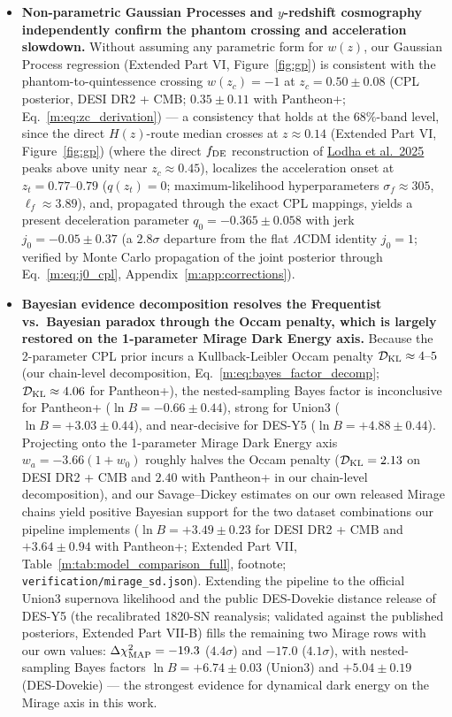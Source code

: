 \documentclass[aps,prd,preprint,superscriptaddress,nofootinbib]{revtex4-2}
\begin{document}
\begin{itemize}
    \item[\textcolor{tealaccent}{\textbullet}] \textbf{Non-parametric Gaussian Processes and $y$-redshift cosmography independently confirm the phantom crossing and acceleration slowdown.} Without assuming any parametric form for $w(z)$, our Gaussian Process regression (Extended Part VI, Figure~\ref{fig:gp}) is consistent with the phantom-to-quintessence crossing $w(z_c) = -1$ at $z_c = 0.50 \pm 0.08$ (CPL posterior, DESI DR2 + CMB; $0.35 \pm 0.11$ with Pantheon+; Eq.~\ref{m:eq:zc_derivation}) --- a consistency that holds at the $68\%$-band level, since the direct $H(z)$-route median crosses at $z \approx 0.14$ (Extended Part VI, Figure~\ref{fig:gp}) (where the direct $f_{\rm DE}$ reconstruction of \href{https://arxiv.org/abs/2503.14743}{Lodha et al.\ 2025} peaks above unity near $z_c \approx 0.45$), localizes the acceleration onset at $z_t = 0.77\text{--}0.79$ ($q(z_t) = 0$; maximum-likelihood hyperparameters $\sigma_f \approx 305$, $\ell_f \approx 3.89$), and, propagated through the exact CPL mappings, yields a present deceleration parameter $q_0 = -0.365 \pm 0.058$ with jerk $j_0 = -0.05 \pm 0.37$ (a $2.8\sigma$ departure from the flat $\Lambda$CDM identity $j_0 = 1$; verified by Monte Carlo propagation of the joint posterior through Eq.~\ref{m:eq:j0_cpl}, Appendix~\ref{m:app:corrections}).
    \item[\textcolor{tealaccent}{\textbullet}] \textbf{Bayesian evidence decomposition resolves the Frequentist vs.\ Bayesian paradox through the Occam penalty, which is largely restored on the 1-parameter Mirage Dark Energy axis.} Because the 2-parameter CPL prior incurs a Kullback-Leibler Occam penalty $\mathcal{D}_{\rm KL} \approx 4\text{--}5$ (our chain-level decomposition, Eq.~\ref{m:eq:bayes_factor_decomp}; $\mathcal{D}_{\rm KL} \approx 4.06$ for Pantheon+), the nested-sampling Bayes factor is inconclusive for Pantheon+ ($\ln B = -0.66 \pm 0.44$), strong for Union3 ($\ln B = +3.03 \pm 0.44$), and near-decisive for DES-Y5 ($\ln B = +4.88 \pm 0.44$). Projecting onto the 1-parameter Mirage Dark Energy axis $w_a = -3.66(1+w_0)$ roughly halves the Occam penalty ($\mathcal{D}_{\rm KL} = 2.13$ on DESI DR2 + CMB and $2.40$ with Pantheon+ in our chain-level decomposition), and our Savage--Dickey estimates on our own released Mirage chains yield positive Bayesian support for the two dataset combinations our pipeline implements ($\ln B = +3.49 \pm 0.23$ for DESI DR2 + CMB and $+3.64 \pm 0.94$ with Pantheon+; Extended Part VII, Table~\ref{m:tab:model_comparison_full}, footnote; \texttt{verification/mirage\_sd.json}). Extending the pipeline to the official Union3 supernova likelihood and the public DES-Dovekie distance release of DES-Y5 (the recalibrated 1820-SN reanalysis; validated against the published posteriors, Extended Part VII-B) fills the remaining two Mirage rows with our own values: $\Delta\chi^2_{\rm MAP} = -19.3$ ($4.4\sigma$) and $-17.0$ ($4.1\sigma$), with nested-sampling Bayes factors $\ln B = +6.74 \pm 0.03$ (Union3) and $+5.04 \pm 0.19$ (DES-Dovekie) --- the strongest evidence for dynamical dark energy on the Mirage axis in this work.
\end{itemize}
\clearpage
\end{document}

